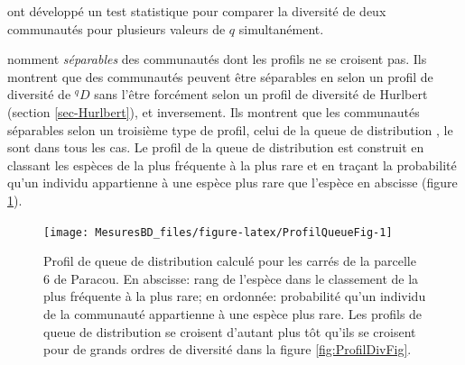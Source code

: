 \documentclass[
  11pt,
  american,
  a4paper,
  extrafontsizes,onecolumn,openright
  ]{memoir}
\newenvironment{Shaded}{\begin{snugshade}}{\end{snugshade}}
\newcommand{\AttributeTok}[1]{\textcolor[rgb]{0.13,0.29,0.53}{#1}}
\newcommand{\CommentTok}[1]{\textcolor[rgb]{0.56,0.35,0.01}{\textit{#1}}}
\newcommand{\DecValTok}[1]{\textcolor[rgb]{0.00,0.00,0.81}{#1}}
\newcommand{\FunctionTok}[1]{\textcolor[rgb]{0.13,0.29,0.53}{\textbf{#1}}}
\newcommand{\NormalTok}[1]{#1}
\newcommand{\SpecialCharTok}[1]{\textcolor[rgb]{0.81,0.36,0.00}{\textbf{#1}}}
\newcommand{\StringTok}[1]{\textcolor[rgb]{0.31,0.60,0.02}{#1}}
\begin{document}
\scriptsize

\begin{Shaded}
\end{Shaded}

\normalsize

\textcite{Pallmann2012} ont développé un test statistique pour comparer la diversité de deux communautés pour plusieurs valeurs de \(q\) simultanément.

\textcite{Liu2006} nomment \emph{séparables} des communautés dont les profils ne se croisent pas.
Ils montrent que des communautés peuvent être séparables en selon un profil de diversité de \(^{q}\!D\) sans l'être forcément selon un profil de diversité de Hurlbert (section \ref{sec-Hurlbert}), et inversement.
Ils montrent que les communautés séparables selon un troisième type de profil, celui de la queue de distribution \autocite{Patil1982}, le sont dans tous les cas.
Le profil de la queue de distribution est construit en classant les espèces de la plus fréquente à la plus rare et en traçant la probabilité qu'un individu appartienne à une espèce plus rare que l'espèce en abscisse (figure \ref{fig:ProfilQueueFig}).



\scriptsize

\begin{figure}

{\centering \texttt{[image: MesuresBD\_files/figure-latex/ProfilQueueFig-1]} 

}

\caption{Profil de queue de distribution calculé pour les carrés de la parcelle 6 de Paracou. En abscisse: rang de l'espèce dans le classement de la plus fréquente à la plus rare; en ordonnée: probabilité qu'un individu de la communauté appartienne à une espèce plus rare. Les profils de queue de distribution se croisent d'autant plus tôt qu'ils se croisent pour de grands ordres de diversité dans la figure \ref{fig:ProfilDivFig}.}\label{fig:ProfilQueueFig}
\end{figure}
\end{document}
